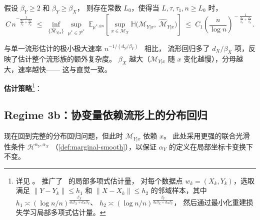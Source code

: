 \begin{Theorem}[流形回归的极小极大速率]\label{def:thm-manifold-regression}
    假设 $\beta_Y \geq 2$ 和 $\beta_Y \geq \beta_X$，
    则存在常数 $L_0$，使得当 $L, \tau, \tau_1, n \geq L_0$ 时，
    \begin{equation}\label{eq:manifold-regression-rate}
        C\,n^{-\frac{1}{\frac{d_Y}{\beta_Y} + \frac{d_X}{\beta_X}}}
        \;\leq\;
        \inf_{\{\widehat{\mathcal{M}}_{Y|x}\}}
        \sup_{\mu^* \in \mathcal{P}^*}
        \;
        \mathbb{E}_{\mu^{*,\otimes n}}\!\left[
            \sup_{x \in \mathcal{M}_X}
            \mathbb{H}\!\big(\mathcal{M}_{Y|x},\; \widehat{\mathcal{M}}_{Y|x}\big)
        \right]
        \;\leq\;
        C_1\!\left(\frac{n}{\log n}\right)^{\!
            -\frac{1}{\frac{d_Y}{\beta_Y} + \frac{d_X}{\beta_X}}}.
    \end{equation}
\end{Theorem}

与单一流形估计的极小极大速率
$n^{-1/(d_Y/\beta_Y)}$~\citep{AamariLevrard2019} 相比，
流形回归多了 $d_X/\beta_X$ 项，反映了估计整个流形族的额外复杂度。
$\beta_X$ 越大（$\mathcal{M}_{Y|x}$ 随 $x$ 变化越慢），分母越大，速率越快——
这与直觉一致。

\textbf{估计策略}\footnote{详见 \citep[Section 4.1]{tang2025regression}。
推广了~\citep{AamariLevrard2019} 的局部多项式估计量，
对每个数据点 $w_k = (X_k, Y_k)$，选取满足
$\|Y - Y_k\| \leq h_1$ 和 $\|X - X_k\| \leq h_2$
的邻域样本，其中
$h_1 \asymp (\log n/n)^{\frac{\beta_X}{d_Y\beta_X+d_X\beta_Y}}$、
$h_2 \asymp (\log n/n)^{\frac{\beta_Y}{d_Y\beta_X+d_X\beta_Y}}$，
然后通过最小化重建损失学习局部多项式估计量。}：

\subsection{Regime 3b：协变量依赖流形上的分布回归}\label{sec:ch2-regime3b}

现在回到完整的分布回归问题，但此时 $\mathcal{M}_{Y|x}$ 依赖 $x$。
此处采用更强的联合光滑性条件 $\mathcal{H}^{\alpha_Y,\alpha_X}$
（\cref{def:marginal-smooth}），以保证 $\alpha_Y$ 的定义在局部坐标卡变换下不变。

